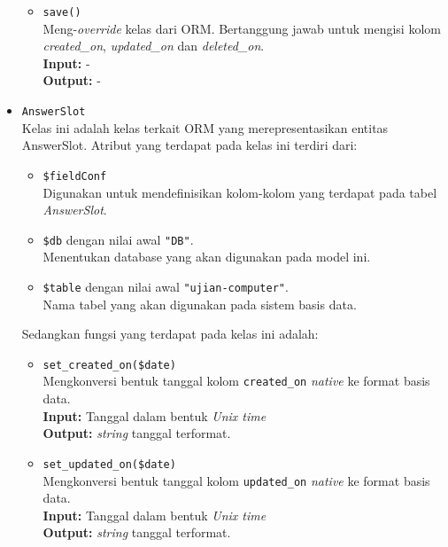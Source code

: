 \begin{itemize}
\begin{itemize}
                \item \texttt{save()}\\
                    Meng-\textit{override} kelas dari ORM. Bertanggung jawab
                    untuk mengisi kolom \textit{created\_on},
                    \textit{updated\_on} dan \textit{deleted\_on}.\\
                    \textbf{Input:} -\\
                    \textbf{Output:} -
            \end{itemize}
            
        \item \texttt{AnswerSlot} \\
            Kelas ini adalah kelas terkait ORM yang merepresentasikan entitas
            AnswerSlot. Atribut yang terdapat pada kelas ini terdiri dari:
            \begin{itemize}
                \item \texttt{\$fieldConf} \\
                    Digunakan untuk mendefinisikan kolom-kolom yang terdapat
                    pada tabel \textit{AnswerSlot}.
                \item \texttt{\$db} dengan nilai awal \texttt{"DB"}. \\
                    Menentukan database yang akan digunakan pada model ini.
                \item \texttt{\$table} dengan nilai awal
                \texttt{"ujian-computer"}. \\
                    Nama tabel yang akan digunakan pada sistem basis data. 
            \end{itemize}
            Sedangkan fungsi yang terdapat pada kelas ini adalah:
            \begin{itemize}
                \item \texttt{set\_created\_on(\$date)} \\
                    Mengkonversi bentuk tanggal kolom \texttt{created\_on}
                    \textit{native} ke format basis data. \\
                    \textbf{Input:} Tanggal dalam bentuk \textit{Unix time}\\
                    \textbf{Output:} \textit{string} tanggal terformat.
                
                \item \texttt{set\_updated\_on(\$date)} \\
                    Mengkonversi bentuk tanggal kolom \texttt{updated\_on}
                    \textit{native} ke format basis data. \\
                    \textbf{Input:} Tanggal dalam bentuk \textit{Unix time}\\
                    \textbf{Output:} \textit{string} tanggal terformat.
                    

\end{itemize}
\end{itemize}
